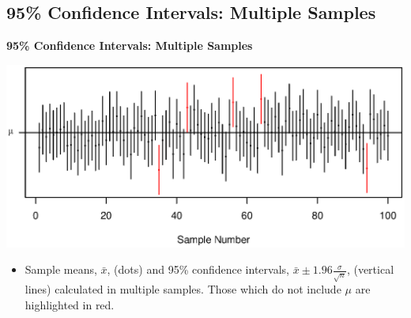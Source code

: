 \documentclass[compress]{beamer}        %
\makeatletter
\newcommand{\tcb}{\textcolor{beamer@blendedblue}}
\makeatother
\begin{document}
\subsection{95\% Confidence Intervals: Multiple Samples}
\begin{frame}{\bf \tcb{95\% Confidence Intervals: Multiple Samples}\\[-1.1cm]}

\begin{center}
\includegraphics[width=1\textwidth, trim = 0.5cm 0.5cm 1cm 1.3cm, clip]{CIs}
\end{center}

\begin{itemize}
\item Sample means, $\bar x$, (dots) and 95\% confidence intervals, $\bar x \pm 1.96 \frac{\sigma}{\sqrt{n}}$, (vertical lines) calculated in multiple samples. Those which do not include $\mu$ are highlighted in red.
\end{itemize}


\end{frame}
\end{document}
